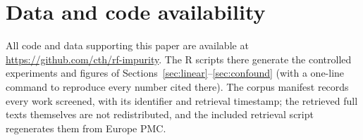 \documentclass[11pt]{article}
\begin{document}
\section{Data and code availability}
\label{sec:availability}

All code and data supporting this paper are available at
\url{https://github.com/cth/rf-impurity}. The R scripts there generate the
controlled experiments and figures of
Sections~\ref{sec:linear}--\ref{sec:confound} (with a one-line command to
reproduce every number cited there). The corpus manifest records every work
screened, with its identifier and retrieval timestamp; the retrieved full
texts themselves are not redistributed, and the included retrieval script
regenerates them from Europe PMC.

\appendix




\end{document}
